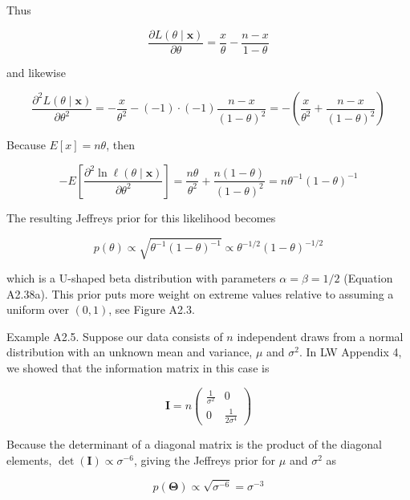 \documentclass{article}
\begin{document}
Thus

\begin{equation}
\frac{\partial L(\theta\mid\mathbf{x})}{\partial\theta}=\frac{x}{\theta}-\frac{n-x}{1-\theta}
\end{equation}

and likewise

\begin{equation}
\frac{\partial^{2}L(\theta\mid\mathbf{x})}{\partial\theta^{2}}=-\frac{x}{\theta^{2}}-(-1)\cdot(-1)\frac{n-x}{(1-\theta)^{2}}=-\left(\frac{x}{\theta^{2}}+\frac{n-x}{(1-\theta)^{2}}\right)
\end{equation}

Because  $ E[x] = n\theta $, then

\begin{equation}
-E\left[\frac{\partial^{2}\ln\ell(\theta\mid\mathbf{x})}{\partial\theta^{2}}\right]=\frac{n\theta}{\theta^{2}}+\frac{n(1-\theta)}{(1-\theta)^{2}}=n\theta^{-1}(1-\theta)^{-1}
\end{equation}

The resulting Jeffreys prior for this likelihood becomes

\begin{equation}
p(\theta)\propto\sqrt{\theta^{-1}(1-\theta)^{-1}}\propto\theta^{-1/2}(1-\theta)^{-1/2}
\end{equation}

which is a U-shaped beta distribution with parameters  $ \alpha = \beta = 1/2 $ (Equation A2.38a). This prior puts more weight on extreme values relative to assuming a uniform over  $ (0,1) $, see Figure A2.3.

Example A2.5. Suppose our data consists of $n$ independent draws from a normal distribution with an unknown mean and variance, $\mu$ and $\sigma^{2}$. In LW Appendix 4, we showed that the information matrix in this case is

\begin{equation}
\mathbf{I}=n\begin{pmatrix}{{{\frac{1}{\sigma^{2}}}}}&{{{0}}} \\{{{0}}}&{{{\frac{1}{2\sigma^{4}}}}}\end{pmatrix}
\end{equation}

Because the determinant of a diagonal matrix is the product of the diagonal elements,  $ \det(\mathbf{I}) \propto \sigma^{-6} $, giving the Jeffreys prior for  $ \mu $ and  $ \sigma^{2} $ as

\begin{equation}
p(\boldsymbol{\Theta})\propto\sqrt{\sigma^{-6}}=\sigma^{-3}
\end{equation}
\end{document}
